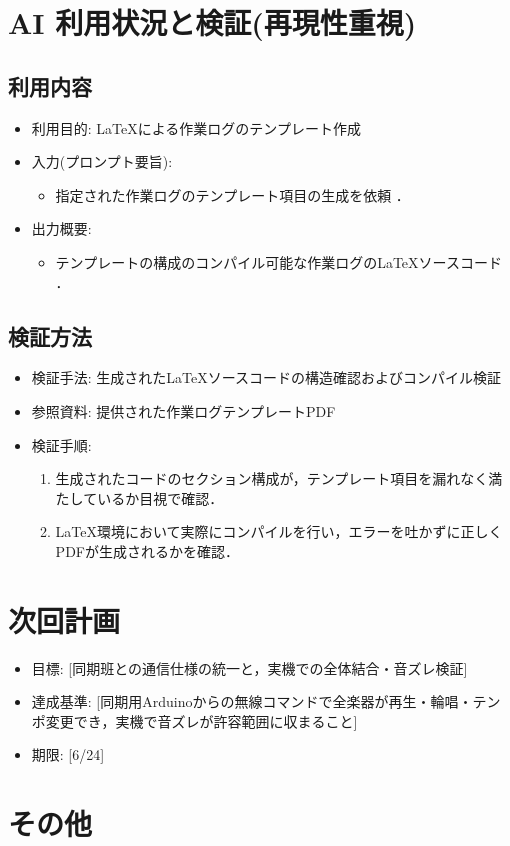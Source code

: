 \documentclass[uplatex,dvipdfmx]{jlreq}
\begin{document}
\section{AI 利用状況と検証(再現性重視)}
\subsection{利用内容}
\begin{itemize}
    \item 利用目的: \LaTeX による作業ログのテンプレート作成
    \item  入力(プロンプト要旨):
    \begin{itemize}
        \item 指定された作業ログのテンプレート項目の生成を依頼 ．
    \end{itemize}
    \item  出力概要:
    \begin{itemize}
        \item テンプレートの構成のコンパイル可能な作業ログの\LaTeX ソースコード ．
    \end{itemize}
\end{itemize}

\subsection{検証方法}
\begin{itemize}
    \item  検証手法: 生成された\LaTeX ソースコードの構造確認およびコンパイル検証
    \item  参照資料: 提供された作業ログテンプレートPDF
    \item  検証手順:
    \begin{enumerate}
        \item 生成されたコードのセクション構成が，テンプレート項目を漏れなく満たしているか目視で確認．
        \item \LaTeX 環境において実際にコンパイルを行い，エラーを吐かずに正しくPDFが生成されるかを確認．
    \end{enumerate}
\end{itemize}

\section{次回計画}
\begin{itemize}
    \item  目標: [同期班との通信仕様の統一と，実機での全体結合・音ズレ検証]
    \item  達成基準: [同期用Arduinoからの無線コマンドで全楽器が再生・輪唱・テンポ変更でき，実機で音ズレが許容範囲に収まること]
    \item  期限: [6/24]
\end{itemize}

\section{その他}
\end{document}
